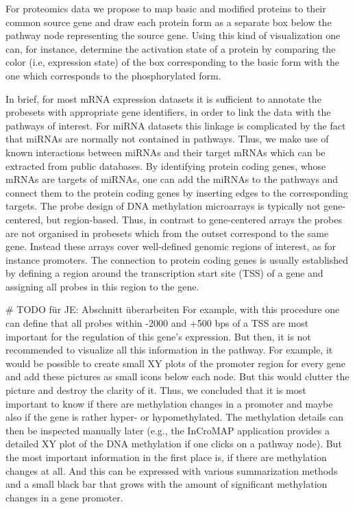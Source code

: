 \documentclass{bioinfo}
\begin{document}
For proteomics data we propose to map basic and modified proteins to their common source gene and 
draw each protein form as a separate box below the pathway node representing the source gene. Using this kind of
visualization one can, for instance, determine the activation state of a protein by comparing the color (i.e, expression state)
of the box corresponding to the basic form with the one which corresponds to the phosphorylated form. 

In brief, for most mRNA expression datasets it is sufficient to annotate the probesets with appropriate 
gene identifiers, in order to link the data with the pathways of interest. For miRNA datasets this linkage
is complicated by the fact that miRNAs are normally not contained in pathways. Thus, we make use of known
interactions between miRNAs and their target mRNAs which can be extracted from public databases. 
By identifying protein coding genes, whose mRNAs are targets of miRNAs, one can add the miRNAs to the pathways 
and connect them to the protein coding genes by inserting edges to the corresponding targets.
%
The probe design of DNA methylation microarrays is typically not gene-centered, but 
region-based. Thus, in contrast to gene-centered arrays the probes are not organised in 
probesets which from the outset correspond to the same gene. Instead these arrays 
cover well-defined genomic regions of interest, as for instance promoters. The connection to protein 
coding genes is usually established by defining a region around the transcription start site (TSS)
of a gene and assigning all probes in this region to the gene.

# TODO für JE: Abschnitt überarbeiten
For example, with this procedure one can define that all probes within -2000 and +500 bps of a TSS
are most important for the regulation of this gene's expression.  But then, it is not recommended to
visualize all this information in the pathway. For example, it would be possible to create small XY
plots of the promoter region for every gene and add these pictures as small icons below each
node. But this would clutter the picture and destroy the clarity of it. Thus, we concluded that it
is most important to know if there are methylation changes in a promoter and maybe also if the gene
is rather hyper- or hypomethylated. The methylation details can then be inspected manually later
(e.g., the InCroMAP application provides a detailed XY plot of the DNA methylation if one clicks on
a pathway node). But the most important information in the first place is, if there are methylation
changes at all. And this can be expressed with various summarization methods and a small black bar
that grows with the amount of significant methylation changes in a gene promoter.
\end{document}
